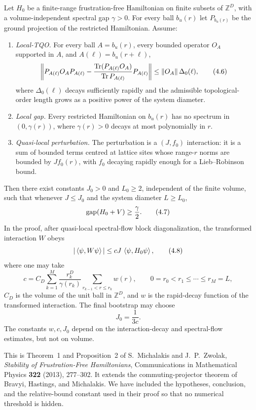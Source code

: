 \begin{theorem}
\label{thm:MZ}
Let $H_0$ be a finite-range frustration-free Hamiltonian on finite
subsets of $\mathbb Z^D$, with a volume-independent spectral gap
$\gamma>0$.  For every ball $b_u(r)$ let $P_{b_u(r)}$ be the ground
projection of the restricted Hamiltonian.  Assume:
\begin{enumerate}[label=\textup{(\roman*)}]
\item \emph{Local-TQO.}  For every ball $A=b_u(r)$, every bounded
operator $O_A$ supported in $A$, and
$A(\ell)=b_u(r+\ell)$,
\[
 \left\|
 P_{A(\ell)}O_AP_{A(\ell)}
 -\frac{\operatorname{Tr}(P_{A(\ell)}O_A)}
 {\operatorname{Tr} P_{A(\ell)}}P_{A(\ell)}
 \right\|
 \leq\left\lVert O_A\right\rVert\Delta_0(\ell),
\tag{4.6}\label{eq:MZLTQO}
\]
where $\Delta_0(\ell)$ decays sufficiently rapidly and the admissible
topological-order length grows as a positive power of the system
diameter.
\item \emph{Local gap.}  Every restricted Hamiltonian on $b_u(r)$ has
no spectrum in $(0,\gamma(r))$, where $\gamma(r)>0$ decays at most
polynomially in $r$.
\item \emph{Quasi-local perturbation.}  The perturbation is a
$(J,f_0)$ interaction: it is a sum of bounded terms centred at lattice
sites whose range-$r$ norms are bounded by $Jf_0(r)$, with $f_0$
decaying rapidly enough for a Lieb--Robinson bound.
\end{enumerate}
Then there exist constants $J_0>0$ and $L_0\geq2$, independent of the
finite volume, such that whenever $J\leq J_0$ and the system diameter
$L\geq L_0$,
\[
 \operatorname{gap}(H_0+V)\geq\frac{\gamma}{2}.
\tag{4.7}\label{eq:MZgap}
\]
In the proof, after quasi-local spectral-flow block diagonalization,
the transformed interaction $W$ obeys
\[
 |\left\langle \psi,W\psi\right\rangle|
 \leq cJ\,\left\langle \psi,H_0\psi\right\rangle,
\tag{4.8}\label{eq:MZrelative}
\]
where one may take
\[
 c=C_D\sum_{k=1}^{M}
 \frac{r_k^D}{\gamma(r_k)}
 \sum_{r_{k-1}<r\leq r_k}w(r),
\qquad
 0=r_0<r_1\leq\cdots\leq r_M=L,
\tag{4.9}\label{eq:MZc}
\]
$C_D$ is the volume of the unit ball in $\mathbb Z^D$, and $w$ is the
rapid-decay function of the transformed interaction.  The final
bootstrap may choose
\[
 J_0=\frac1{3c}.
\tag{4.10}\label{eq:MZJ0}
\]
The constants $w,c,J_0$ depend on the interaction-decay and
spectral-flow estimates, but not on volume.
\end{theorem}

This is Theorem~1 and Proposition~2 of
S.~Michalakis and J.~P.~Zwolak,
\emph{Stability of Frustration-Free Hamiltonians},
Communications in Mathematical Physics \textbf{322} (2013), 277--302.
It extends the commuting-projector theorem of Bravyi, Hastings, and
Michalakis.  We have included the hypotheses, conclusion, and the
relative-bound constant used in their proof so that no numerical
threshold is hidden.

